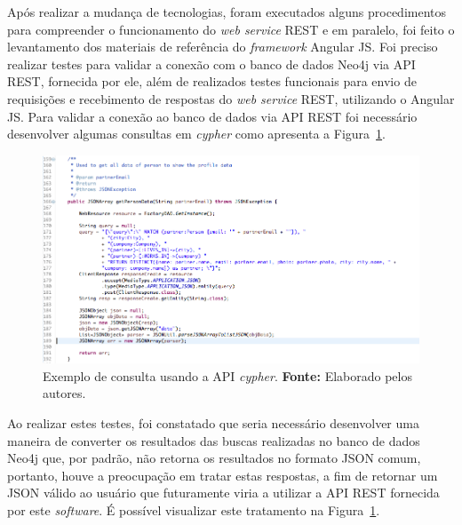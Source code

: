 
\par Após realizar a mudança de tecnologias, foram executados alguns procedimentos para compreender o funcionamento do \textit{web service} REST e em paralelo, foi feito o levantamento dos materiais de referência do \textit{framework} Angular JS. Foi preciso realizar testes para validar a conexão com o banco de dados Neo4j via API REST, fornecida por ele, além de realizados testes funcionais para envio de requisições e recebimento de respostas do \textit{web service} REST, utilizando o Angular JS. Para validar a conexão ao banco de dados via API REST foi necessário desenvolver algumas consultas em \textit{cypher} como apresenta a Figura~\ref{fig:consulta_usando_api_cypher}.

\begin{figure}[h!]
	\centerline{\includegraphics[scale=0.45]{./imagens/query-cypher.png}}
	\caption[Exemplo de consulta usando a API \textit{cypher}]
	{Exemplo de consulta usando a API \textit{cypher}. \textbf{Fonte:} Elaborado pelos autores.}
	\label{fig:consulta_usando_api_cypher}
\end{figure}

\par Ao realizar estes testes, foi constatado que seria necessário desenvolver uma maneira de converter os resultados das buscas realizadas no banco de dados Neo4j que, por padrão, não retorna os resultados no formato JSON comum, portanto, houve a preocupação em tratar estas respostas, a fim de retornar um JSON válido ao usuário que futuramente viria a utilizar a API REST fornecida por este \textit{software}. É possível visualizar este tratamento na Figura~\ref{fig:consulta_usando_api_cypher}. 
 
